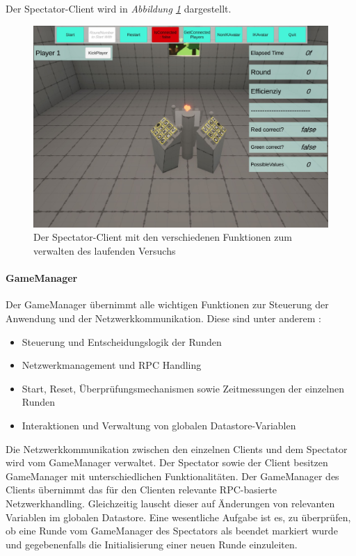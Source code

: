 \documentclass[a4paper,11pt]{article}%
\renewcommand{\\}{\vspace*{0.5\baselineskip} \newline}
\begin{document}
Der Spectator-Client wird in \textit{Abbildung \ref{SpectatorView}} dargestellt.

\begin{figure}[H]
		\begin{footnotesize}
		\centering
			\includegraphics[scale=0.3]{Abbildungen/Versuchsumgebung/SpectatorView.JPG}
			\caption[Der Spectatorview]{Der Spectator-Client mit den verschiedenen Funktionen zum verwalten des laufenden Versuchs}
			\label{SpectatorView}
		\end{footnotesize}
	\end{figure}
	
\paragraph{GameManager}
Der GameManager übernimmt alle wichtigen Funktionen zur Steuerung der Anwendung und der Netzwerkkommunikation.
Diese sind unter anderem :
\begin{itemize}[itemsep=0cm]
\item Steuerung und Entscheidungslogik der Runden
\item Netzwerkmanagement und RPC Handling
\item Start, Reset, Überprüfungsmechanismen sowie Zeitmessungen der einzelnen Runden
\item Interaktionen und Verwaltung von globalen Datastore-Variablen
\end{itemize}

Die Netzwerkkommunikation zwischen den einzelnen Clients und dem Spectator wird vom GameManager verwaltet. Der Spectator sowie der Client besitzen GameManager mit unterschiedlichen Funktionalitäten. Der GameManager des Clients übernimmt das für den Clienten relevante RPC-basierte Netzwerkhandling. Gleichzeitig lauscht dieser auf Änderungen von relevanten Variablen im globalen Datastore. Eine wesentliche Aufgabe ist es, zu überprüfen, ob eine Runde vom GameManager des Spectators als beendet markiert wurde und gegebenenfalls die Initialisierung einer neuen Runde einzuleiten.
\end{document}
